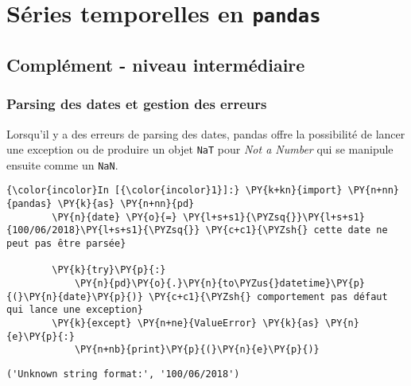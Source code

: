     
    
    
    

    

    \hypertarget{suxe9ries-temporelles-en-pandas}{%
\section{\texorpdfstring{Séries temporelles en
\texttt{pandas}}{Séries temporelles en pandas}}\label{suxe9ries-temporelles-en-pandas}}

    \hypertarget{compluxe9ment---niveau-intermuxe9diaire}{%
\subsection{Complément - niveau
intermédiaire}\label{compluxe9ment---niveau-intermuxe9diaire}}

    \hypertarget{parsing-des-dates-et-gestion-des-erreurs}{%
\subsubsection{Parsing des dates et gestion des
erreurs}\label{parsing-des-dates-et-gestion-des-erreurs}}

    Lorsqu'il y a des erreurs de parsing des dates, pandas offre la
possibilité de lancer une exception ou de produire un objet \texttt{NaT}
pour \emph{Not a Number} qui se manipule ensuite comme un \texttt{NaN}.

    \begin{Verbatim}[commandchars=\\\{\},frame=single,framerule=0.3mm,rulecolor=\color{cellframecolor}]
{\color{incolor}In [{\color{incolor}1}]:} \PY{k+kn}{import} \PY{n+nn}{pandas} \PY{k}{as} \PY{n+nn}{pd}
        \PY{n}{date} \PY{o}{=} \PY{l+s+s1}{\PYZsq{}}\PY{l+s+s1}{100/06/2018}\PY{l+s+s1}{\PYZsq{}} \PY{c+c1}{\PYZsh{} cette date ne peut pas être parsée}
        
        \PY{k}{try}\PY{p}{:}
            \PY{n}{pd}\PY{o}{.}\PY{n}{to\PYZus{}datetime}\PY{p}{(}\PY{n}{date}\PY{p}{)} \PY{c+c1}{\PYZsh{} comportement pas défaut qui lance une exception}
        \PY{k}{except} \PY{n+ne}{ValueError} \PY{k}{as} \PY{n}{e}\PY{p}{:}
            \PY{n+nb}{print}\PY{p}{(}\PY{n}{e}\PY{p}{)}
\end{Verbatim}


    \begin{Verbatim}[commandchars=\\\{\},frame=single,framerule=0.3mm,rulecolor=\color{cellframecolor}]
('Unknown string format:', '100/06/2018')
\end{Verbatim}

